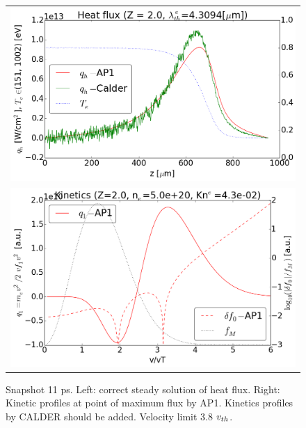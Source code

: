 \begin{figure}[tbh]
  \begin{center}
    \begin{tabular}{c}
      \includegraphics[width=\figscale\textwidth]{../VFPdata/C7_Calder_case1_heatflux.png} \\ 
      \includegraphics[width=\figscale\textwidth]{../VFPdata/C7_Calder_case1_kinetics.png}
    \end{tabular}
  \caption{  
  Snapshot 11 ps. Left: correct steady solution of heat flux. 
  Right: Kinetic profiles at point of maximum flux by AP1. 
  Kinetics profiles by CALDER should be added. Velocity limit 3.8 $v_{th}$.
  }
  \end{center}
  \label{fig:C7_CALDER_case1}
\end{figure}

